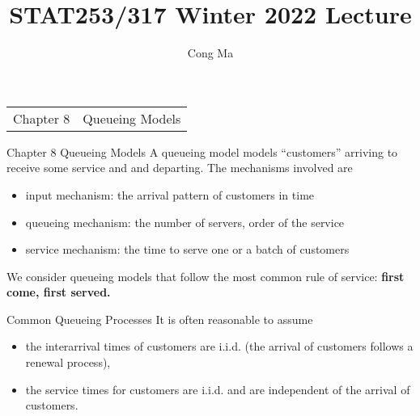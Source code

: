\documentclass[letterpaper,handout]{beamer}
\title{STAT253/317 Winter 2022 Lecture \chapnum}  \author{Cong Ma}
\begin{document}
\begin{frame}
\maketitle
\begin{center}\large
\begin{tabular}{ll}
Chapter 8   & Queueing Models
\end{tabular}
\end{center}
\end{frame}


\begin{frame}{Chapter 8\; Queueing Models}
A queueing model models ``customers'' arriving to receive some service and and departing. The mechanisms involved are
\begin{itemize}
\item input mechanism: the arrival pattern of customers in time
\item queueing mechanism: the number of servers, order of the service
\item service mechanism: the time to serve one or a batch of customers
\end{itemize}
We consider queueing models that follow the most common rule of service: \textbf{first come, first served.}
\end{frame}
\begin{frame}{Common Queueing Processes}
It is often reasonable to assume
\begin{itemize}
\item the interarrival times of customers are i.i.d. (the arrival of customers follows a renewal process),
\item the service times for customers are i.i.d. and are independent of the arrival of customers.
\end{itemize}


\end{frame}
\end{document}
